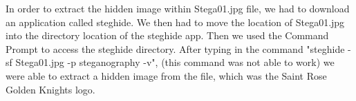 \documentclass[12ptletterpaper]{paper}
\newcommand\tab[1][1cm]{\hspace*{#1}}
\begin{document}
\begin{flushleft}
		\tab In order to extract the hidden image within Stega01.jpg file, we had to download an application called steghide. We then had to move the location of Stega01.jpg into the directory location of the steghide app. Then we used the Command Prompt to access the steghide directory. After typing in the command "steghide -sf Stega01.jpg -p steganography -v", (this command was not able to work) we were able to extract a hidden image from the file, which was the Saint Rose Golden Knights logo.\\
		
		
	\end{flushleft}	
\end{document}
